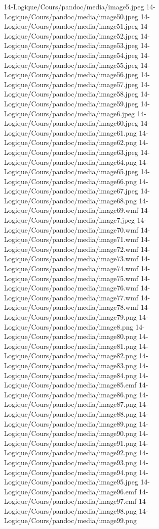 14-Logique/Cours/pandoc/media/image5.jpeg 14-Logique/Cours/pandoc/media/image50.jpeg 14-Logique/Cours/pandoc/media/image51.jpeg 14-Logique/Cours/pandoc/media/image52.jpeg 14-Logique/Cours/pandoc/media/image53.jpeg 14-Logique/Cours/pandoc/media/image54.jpeg 14-Logique/Cours/pandoc/media/image55.jpeg 14-Logique/Cours/pandoc/media/image56.jpeg 14-Logique/Cours/pandoc/media/image57.jpeg 14-Logique/Cours/pandoc/media/image58.jpeg 14-Logique/Cours/pandoc/media/image59.jpeg 14-Logique/Cours/pandoc/media/image6.jpeg 14-Logique/Cours/pandoc/media/image60.jpeg 14-Logique/Cours/pandoc/media/image61.png 14-Logique/Cours/pandoc/media/image62.png 14-Logique/Cours/pandoc/media/image63.jpeg 14-Logique/Cours/pandoc/media/image64.png 14-Logique/Cours/pandoc/media/image65.jpeg 14-Logique/Cours/pandoc/media/image66.png 14-Logique/Cours/pandoc/media/image67.jpeg 14-Logique/Cours/pandoc/media/image68.png 14-Logique/Cours/pandoc/media/image69.wmf 14-Logique/Cours/pandoc/media/image7.jpeg 14-Logique/Cours/pandoc/media/image70.wmf 14-Logique/Cours/pandoc/media/image71.wmf 14-Logique/Cours/pandoc/media/image72.wmf 14-Logique/Cours/pandoc/media/image73.wmf 14-Logique/Cours/pandoc/media/image74.wmf 14-Logique/Cours/pandoc/media/image75.wmf 14-Logique/Cours/pandoc/media/image76.wmf 14-Logique/Cours/pandoc/media/image77.wmf 14-Logique/Cours/pandoc/media/image78.wmf 14-Logique/Cours/pandoc/media/image79.png 14-Logique/Cours/pandoc/media/image8.png 14-Logique/Cours/pandoc/media/image80.png 14-Logique/Cours/pandoc/media/image81.png 14-Logique/Cours/pandoc/media/image82.png 14-Logique/Cours/pandoc/media/image83.png 14-Logique/Cours/pandoc/media/image84.png 14-Logique/Cours/pandoc/media/image85.emf 14-Logique/Cours/pandoc/media/image86.png 14-Logique/Cours/pandoc/media/image87.png 14-Logique/Cours/pandoc/media/image88.png 14-Logique/Cours/pandoc/media/image89.png 14-Logique/Cours/pandoc/media/image90.png 14-Logique/Cours/pandoc/media/image91.png 14-Logique/Cours/pandoc/media/image92.png 14-Logique/Cours/pandoc/media/image93.png 14-Logique/Cours/pandoc/media/image94.png 14-Logique/Cours/pandoc/media/image95.jpeg 14-Logique/Cours/pandoc/media/image96.emf 14-Logique/Cours/pandoc/media/image97.emf 14-Logique/Cours/pandoc/media/image98.png 14-Logique/Cours/pandoc/media/image99.png
